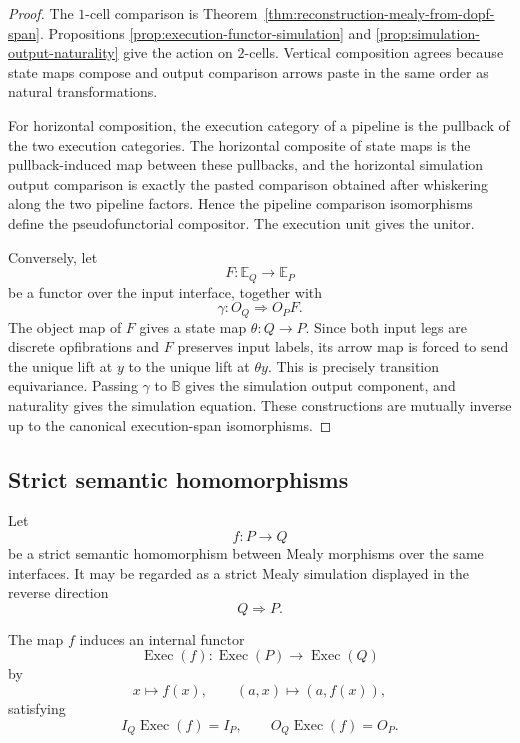 \begin{proof}
The \(1\)-cell comparison is
Theorem~\ref{thm:reconstruction-mealy-from-dopf-span}. Propositions
\ref{prop:execution-functor-simulation} and
\ref{prop:simulation-output-naturality} give the action on \(2\)-cells.
Vertical composition agrees because state maps compose and output comparison
arrows paste in the same order as natural transformations.

For horizontal composition, the execution category of a pipeline is the
pullback of the two execution categories. The horizontal composite of state
maps is the pullback-induced map between these pullbacks, and the horizontal
simulation output comparison is exactly the pasted comparison obtained after
whiskering along the two pipeline factors. Hence the pipeline comparison
isomorphisms define the pseudofunctorial compositor. The execution unit gives
the unitor.

Conversely, let
\[
    F:\mathbb E_Q\to\mathbb E_P
\]
be a functor over the input interface, together with
\[
    \gamma:O_Q\Rightarrow O_PF.
\]
The object map of \(F\) gives a state map \(\theta:Q\to P\). Since both
input legs are discrete opfibrations and \(F\) preserves input labels,
its arrow map is forced to send the unique lift at \(y\) to the unique lift
at \(\theta y\). This is precisely transition equivariance. Passing
\(\gamma\) to \(\mathbb B\) gives the simulation output component, and
naturality gives the simulation equation. These constructions are mutually
inverse up to the canonical execution-span isomorphisms.
\end{proof}

\subsection{Strict semantic homomorphisms}
\label{subsec:execution-strict-homomorphisms}

Let
\[
    f:P\to Q
\]
be a strict semantic homomorphism between Mealy morphisms over the same
interfaces. It may be regarded as a strict Mealy simulation displayed in the
reverse direction
\[
    Q\Longrightarrow P.
\]

\begin{proposition}
\label{prop:functoriality-execution}
The map \(f\) induces an internal functor
\[
    \operatorname{Exec}(f):
    \operatorname{Exec}(P)
    \longrightarrow
    \operatorname{Exec}(Q)
\]
by
\[
    x\longmapsto f(x),
    \qquad
    (a,x)\longmapsto(a,f(x)),
\]
satisfying
\[
    I_Q\operatorname{Exec}(f)=I_P,
    \qquad
    O_Q\operatorname{Exec}(f)=O_P.
\]
\end{proposition}

